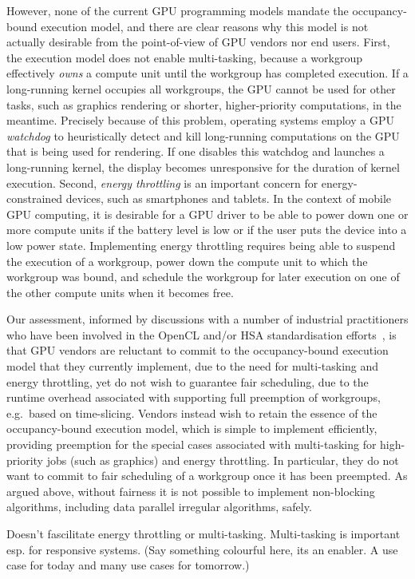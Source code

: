 \documentclass[nocopyrightspace]{sigplanconf-pldi16}
\begin{document}
However, none of the current GPU programming models mandate the
occupancy-bound execution model, and there are clear reasons why this
model is not actually desirable from the point-of-view of GPU vendors
nor end users.  First, the execution model does not enable
multi-tasking, because a workgroup effectively \emph{owns} a compute
unit until the workgroup has completed execution.  If a long-running
kernel occupies all workgroups, the GPU cannot be used for other
tasks, such as graphics rendering or shorter, higher-priority
computations, in the meantime.  Precisely because of this problem,
operating systems employ a GPU \emph{watchdog} to heuristically detect
and kill long-running computations on the GPU that is being used for
rendering.  If one disables this watchdog and launches a long-running
kernel, the display becomes unresponsive for the duration of kernel
execution.  Second, \emph{energy throttling} is an important concern
for energy-constrained devices, such as smartphones and tablets.  In
the context of mobile GPU computing, it is desirable for a GPU driver
to be able to power down one or more compute units if the battery
level is low or if the user puts the device into a low power state.
Implementing energy throttling requires being able to suspend the
execution of a workgroup, power down the compute unit to which the
workgroup was bound, and schedule the workgroup for later execution on
one of the other compute units when it becomes free.

Our assessment, informed by discussions with a number of industrial
practitioners who have been involved in the OpenCL and/or HSA
standardisation efforts~\cite{CitePersonalCommunication}, is that GPU
vendors are reluctant to commit to the occupancy-bound execution model
that they currently implement, due to the need for multi-tasking and
energy throttling, yet do not wish to guarantee fair scheduling, due
to the runtime overhead associated with supporting full preemption of
workgroups, e.g.\ based on time-slicing.  Vendors instead wish to
retain the essence of the occupancy-bound execution model, which is
simple to implement efficiently, providing preemption for the special
cases associated with multi-tasking for high-priority jobs (such as
graphics) and energy throttling.  In particular, they do not want to
commit to fair scheduling of a workgroup once it has been preempted.
As argued above, without fairness it is not possible to implement
non-blocking algorithms, including data parallel irregular algorithms,
safely.


  Doesn't fascilitate energy throttling or
  multi-tasking. Multi-tasking is important esp. for responsive
  systems. (Say something colourful here, its an enabler. A use case
  for today and many use cases for tomorrow.)
\end{document}
